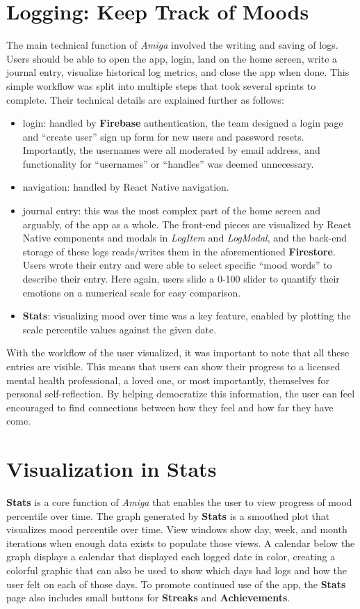 \documentclass[10pt,american english]{article}
\begin{document}
\section*{Logging: Keep Track of Moods}
The main technical function of \textit{Amiga} involved the writing and saving of logs. Users should be able to open the app, login, land on the home screen, write a journal entry, visualize historical log metrics, and close the app when done. This simple workflow was split into multiple steps that took several sprints to complete. Their technical details are explained further as follows:
\begin{itemize}
\item login: handled by \textbf{Firebase} authentication, the team designed a login page and ``create user'' sign up form for new users and password resets. Importantly, the usernames were all moderated by email address, and functionality for ``usernames'' or ``handles'' was deemed unnecessary.
\item navigation: handled by React Native navigation.
\item journal entry: this was the most complex part of the home screen and arguably, of the app as a whole. The front-end pieces are visualized by React Native components and modals in \textit{LogItem} and \textit{LogModal}, and the back-end storage of these logs reads/writes them in the aforementioned \textbf{Firestore}. Users wrote their entry and were able to select specific ``mood words'' to describe their entry. Here again, users slide a 0-100 slider to quantify their emotions on a numerical scale for easy comparison. 
\item \textbf{Stats}: visualizing mood over time was a key feature, enabled by plotting the scale percentile values against the given date.
\end{itemize}
With the workflow of the user visualized, it was important to note that all these entries are visible. This means that users can show their progress to a licensed mental health professional, a loved one, or most importantly, themselves for personal self-reflection. By helping democratize this information, the user can feel encouraged to find connections between how they feel and how far they have come.

\section*{Visualization in Stats}
\textbf{Stats} is a core function of \textit{Amiga} that enables the user to view progress of mood percentile over time. The graph generated by \textbf{Stats} is a smoothed plot that visualizes mood percentile over time. View windows show day, week, and month iterations when enough data exists to populate those views. A calendar below the graph displays a calendar that displayed each logged date in color, creating a colorful graphic that can also be used to show which days had logs and how the user felt on each of those days. To promote continued use of the app, the \textbf{Stats} page also includes small buttons for \textbf{Streaks} and \textbf{Achievements}.
\end{document}
